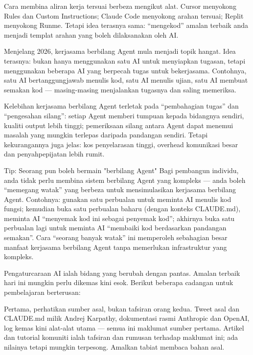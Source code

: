 Cara membina aliran kerja tersuai berbeza mengikut alat. Cursor menyokong Rules dan Custom Instructions; Claude Code menyokong arahan tersuai; Replit menyokong Runme. Tetapi idea terasnya sama: “mengekod” amalan terbaik anda menjadi templat arahan yang boleh dilaksanakan oleh AI.


Menjelang 2026, kerjasama berbilang Agent mula menjadi topik hangat. Idea terasnya: bukan hanya menggunakan satu AI untuk menyiapkan tugasan, tetapi menggunakan beberapa AI yang berpecah tugas untuk bekerjasama. Contohnya, satu AI bertanggungjawab menulis kod, satu AI menulis ujian, satu AI membuat semakan kod — masing-masing menjalankan tugasnya dan saling memeriksa.

Kelebihan kerjasama berbilang Agent terletak pada “pembahagian tugas” dan “pengesahan silang”: setiap Agent memberi tumpuan kepada bidangnya sendiri, kualiti output lebih tinggi; pemeriksaan silang antara Agent dapat menemui masalah yang mungkin terlepas daripada pandangan sendiri. Tetapi kekurangannya juga jelas: kos penyelarasan tinggi, overhead komunikasi besar dan penyahpepijatan lebih rumit.

\begin{tcbinfo}{Tip: Seorang pun boleh bermain "berbilang Agent"}
Bagi pembangun individu, anda tidak perlu membina sistem berbilang Agent yang kompleks — anda boleh “memegang watak” yang berbeza untuk mensimulasikan kerjasama berbilang Agent. Contohnya: gunakan satu perbualan untuk meminta AI menulis kod fungsi; kemudian buka satu perbualan baharu (dengan konteks CLAUDE.md), meminta AI “menyemak kod ini sebagai penyemak kod”; akhirnya buka satu perbualan lagi untuk meminta AI “membaiki kod berdasarkan pandangan semakan”. Cara “seorang banyak watak” ini memperoleh sebahagian besar manfaat kerjasama berbilang Agent tanpa memerlukan infrastruktur yang kompleks.

\end{tcbinfo}


Pengaturcaraan AI ialah bidang yang berubah dengan pantas. Amalan terbaik hari ini mungkin perlu dikemas kini esok. Berikut beberapa cadangan untuk pembelajaran berterusan:

Pertama, perhatikan sumber asal, bukan tafsiran orang kedua. Tweet asal dan CLAUDE.md milik Andrej Karpathy, dokumentasi rasmi Anthropic dan OpenAI, log kemas kini alat-alat utama — semua ini maklumat sumber pertama. Artikel dan tutorial komuniti ialah tafsiran dan rumusan terhadap maklumat ini; ada nilainya tetapi mungkin terpesong. Amalkan tabiat membaca bahan asal.

